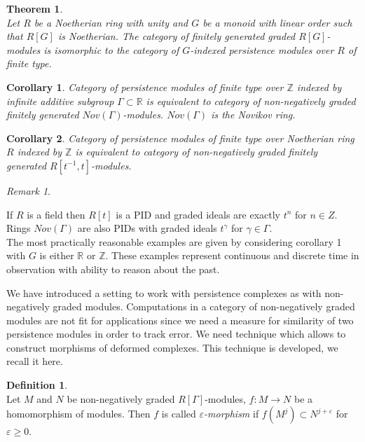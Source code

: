 \documentclass[a4paper, 12pt]{article}
\newtheorem{corollary}{Corollary}
\newtheorem{theorem}{Theorem}
\theoremstyle{definition}
\newtheorem{definition}{Definition}
\theoremstyle{remark}
\newtheorem{remark}{Remark}
\newcommand{\define}[1]{{\textit{#1}}}
\renewcommand{\geq}{\geqslant}
\begin{document}
\begin{theorem} {\cite[Case of Corollary 20 of Theorem 2]{Corbet18}}\\
  Let $R$ be a Noetherian ring with unity and $G$ be a monoid with linear order such that $R[G]$ is Noetherian. The category of finitely generated graded $R[G]$-modules is isomorphic to the category of $G$-indexed persistence modules over $R$ of finite type.
\end{theorem}

\begin{corollary}
  Category of persistence modules of finite type over $\mathbb{Z}$ indexed by infinite additive subgroup $\Gamma \subset \mathbb{R}$ is equivalent to category of non-negatively graded finitely generated $Nov(\Gamma)$-modules. $Nov(\Gamma)$ is the Novikov ring.
\end{corollary}

\begin{corollary}
  Category of persistence modules of finite type over Noetherian ring $R$ indexed by $\mathbb{Z}$ is equivalent to category of non-negatively graded finitely generated $R[t^{-1},t]$-modules.
\end{corollary}

\begin{remark} ~ \par
  If $R$ is a field then $R[t]$ is a PID and graded ideals are exactly $t^n$ for $n \in Z$.\\
  Rings $Nov(\Gamma)$ are also PIDs with graded ideals $t^{\gamma}$ for $\gamma \in \Gamma$.\\

  The most practically reasonable examples are given by considering corollary 1 with $G$ is either $\mathbb{R}$ or $\mathbb{Z}$. These examples represent continuous and discrete time in observation with ability to reason about the past.
\end{remark}

We have introduced a setting to work with persistence complexes as with non-negatively graded modules. Computations in a category of non-negatively graded modules are not fit for applications since we need a measure for similarity of two persistence modules in order to track error. We need technique which allows to construct morphisms of deformed complexes. This technique is developed, we recall it here.\\

\begin{definition} {\cite[Definition 2.7]{GS16}}\\
  Let $M$ and $N$ be non-negatively graded $R[\Gamma]$-modules, $f : M \to N$ be a homomorphism of modules. Then $f$ is called \define{$\varepsilon$-morphism} if $f(M^j) \subset N^{j+\varepsilon}$ for $\varepsilon \geq 0$.
\end{definition}
\end{document}
